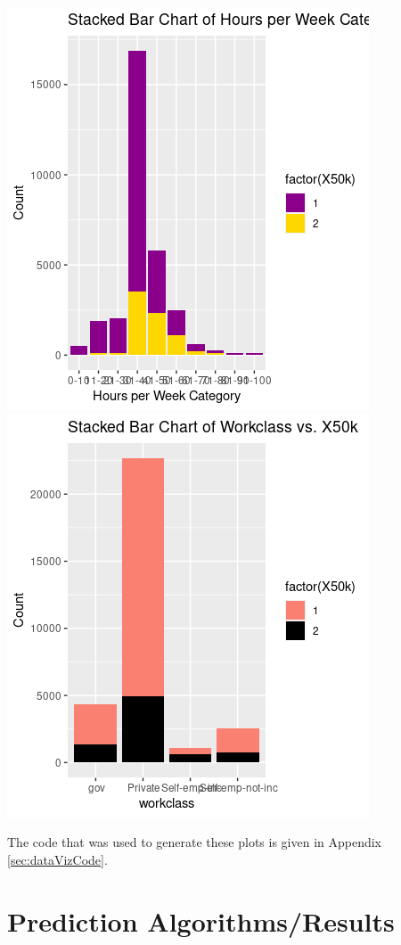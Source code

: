 \documentclass{article}
\begin{document}
\begin{center}
    \includegraphics[scale = 0.6]{hpw_barplot.png} \includegraphics[scale = 0.6]{workclass_barplot.png}
\end{center}

The code that was used to generate these plots is given in Appendix \ref{sec:dataVizCode}. 
    
\section{Prediction Algorithms/Results}
\end{document}

